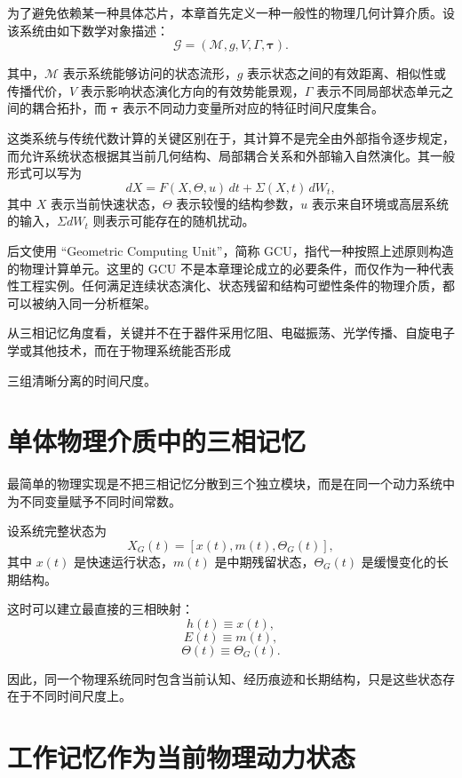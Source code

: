 为了避免依赖某一种具体芯片，本章首先定义一种一般性的物理几何计算介质。设该系统由如下数学对象描述：
\[
\mathcal{G}
=
(
\mathcal{M},
g,
V,
\Gamma,
\boldsymbol{\tau}
).
\]

其中，$\mathcal{M}$ 表示系统能够访问的状态流形，$g$ 表示状态之间的有效距离、相似性或传播代价，$V$ 表示影响状态演化方向的有效势能景观，$\Gamma$ 表示不同局部状态单元之间的耦合拓扑，而 $\boldsymbol{\tau}$ 表示不同动力变量所对应的特征时间尺度集合。

这类系统与传统代数计算的关键区别在于，其计算不是完全由外部指令逐步规定，而允许系统状态根据其当前几何结构、局部耦合关系和外部输入自然演化。其一般形式可以写为
\[
dX
=
F(X,\Theta,u)\,dt
+
\Sigma(X,t)\,dW_t,
\]
其中 $X$ 表示当前快速状态，$\Theta$ 表示较慢的结构参数，$u$ 表示来自环境或高层系统的输入，$\Sigma dW_t$ 则表示可能存在的随机扰动。

后文使用 ``Geometric Computing Unit''，简称 GCU，指代一种按照上述原则构造的物理计算单元。这里的 GCU 不是本章理论成立的必要条件，而仅作为一种代表性工程实例。任何满足连续状态演化、状态残留和结构可塑性条件的物理介质，都可以被纳入同一分析框架。

从三相记忆角度看，关键并不在于器件采用忆阻、电磁振荡、光学传播、自旋电子学或其他技术，而在于物理系统能否形成
\begin{statementbox}
\centering
{}
\end{statementbox}
三组清晰分离的时间尺度。

\section{单体物理介质中的三相记忆}

最简单的物理实现是不把三相记忆分散到三个独立模块，而是在同一个动力系统中为不同变量赋予不同时间常数。

设系统完整状态为
\[
X_G(t)
=
[
x(t),
m(t),
\Theta_G(t)
],
\]
其中 $x(t)$ 是快速运行状态，$m(t)$ 是中期残留状态，$\Theta_G(t)$ 是缓慢变化的长期结构。

这时可以建立最直接的三相映射：
\[
h(t)\equiv x(t),
\]
\[
E(t)\equiv m(t),
\]
\[
\Theta(t)\equiv \Theta_G(t).
\]

因此，同一个物理系统同时包含当前认知、经历痕迹和长期结构，只是这些状态存在于不同时间尺度上。

\section{工作记忆作为当前物理动力状态}

